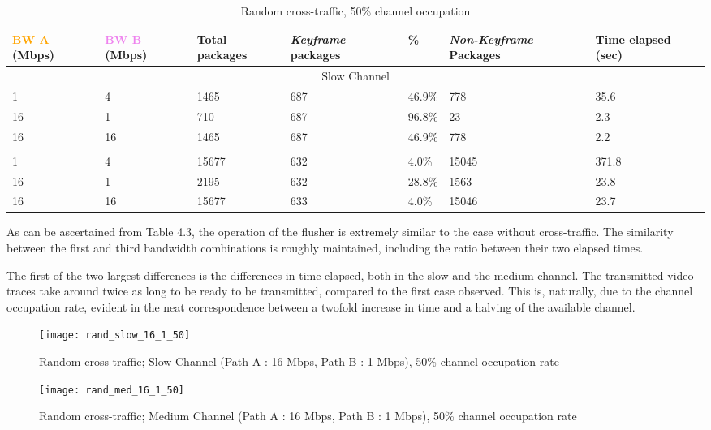 \begin{table}[htbp]
\caption{Random cross-traffic, 50\% channel occupation}
\break
\setlength{\arrayrulewidth}{1mm}
\setlength{\tabcolsep}{12pt}
\renewcommand{\arraystretch}{1.5}
 {
\begin{tabular}{ |p{1.375cm}|p{1.375cm}|p{1.5cm}|p{1.5cm}|p{1cm}|p{1.75cm}|p{1.75cm}| }
\hline
\textcolor{orange}{BW A} (Mbps)&\textcolor{violet}{BW B} (Mbps)& Total packages & \textit{Keyframe} packages & \% & \textit{Non-Keyframe} Packages & Time elapsed (sec) \\
\hline
\multicolumn{7}{|c|}{Slow Channel} \\
\hline
1&4&1465&687&46.9\%&778&35.6\\
16&1&710&687&96.8\%&23&2.3\\
16&16&1465&687&46.9\%&778&2.2\\
\hline
\rowcolor{white}\multicolumn{7}{|c|}{Medium Channel} \\
\hline
1&4&15677&632&4.0\%&15045&371.8\\
16&1&2195&632&28.8\%&1563&23.8\\
16&16&15677&633&4.0\%&15046&23.7\\
\hline
\end{tabular}
}
\end{table}

As can be ascertained from Table 4.3, the operation of the flusher is extremely similar to the case without cross-traffic. The similarity between the first and third bandwidth combinations is roughly maintained, including the ratio between their two elapsed times.

The first of the two largest differences is the differences in time elapsed, both in the slow and the medium channel. The transmitted video traces take around twice as long to be ready to be transmitted, compared to the first case observed. This is, naturally, due to the channel occupation rate, evident in the neat correspondence between a twofold increase in time and a halving of the available channel. 


\begin{figure}[!ht]
\caption{Random cross-traffic; Slow Channel (Path A : 16 Mbps, Path B : 1 Mbps), 50\% channel occupation rate}
\centering
\texttt{[image: rand\_slow\_16\_1\_50]}
\end{figure}

\begin{figure}[!ht]
\caption{Random cross-traffic; Medium Channel (Path A : 16 Mbps, Path B : 1 Mbps), 50\% channel occupation rate}
\centering
\texttt{[image: rand\_med\_16\_1\_50]}
\end{figure}

